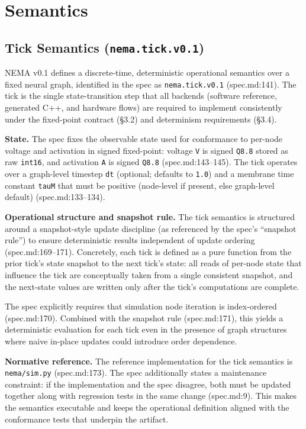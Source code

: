 \section{Semantics}

\subsection{Tick Semantics (\texttt{nema.tick.v0.1})}

NEMA v0.1 defines a discrete-time, deterministic operational semantics over a fixed neural graph, identified in the spec as \texttt{nema.tick.v0.1} (spec.md:141). The tick is the single state-transition step that all backends (software reference, generated C++, and hardware flows) are required to implement consistently under the fixed-point contract (\S3.2) and determinism requirements (\S3.4).

\textbf{State.} The spec fixes the observable state used for conformance to per-node voltage and activation in signed fixed-point: voltage \texttt{V} is signed \texttt{Q8.8} stored as raw \texttt{int16}, and activation \texttt{A} is signed \texttt{Q8.8} (spec.md:143--145). The tick operates over a graph-level timestep \texttt{dt} (optional; defaults to \texttt{1.0}) and a membrane time constant \texttt{tauM} that must be positive (node-level if present, else graph-level default) (spec.md:133--134).

\textbf{Operational structure and snapshot rule.} The tick semantics is structured around a snapshot-style update discipline (as referenced by the spec's ``snapshot rule'') to ensure deterministic results independent of update ordering (spec.md:169--171). Concretely, each tick is defined as a pure function from the prior tick's state snapshot to the next tick's state: all reads of per-node state that influence the tick are conceptually taken from a single consistent snapshot, and the next-state values are written only after the tick's computations are complete.

The spec explicitly requires that simulation node iteration is index-ordered (spec.md:170). Combined with the snapshot rule (spec.md:171), this yields a deterministic evaluation for each tick even in the presence of graph structures where naive in-place updates could introduce order dependence.

\textbf{Normative reference.} The reference implementation for the tick semantics is \texttt{nema/sim.py} (spec.md:173). The spec additionally states a maintenance constraint: if the implementation and the spec disagree, both must be updated together along with regression tests in the same change (spec.md:9). This makes the semantics executable and keeps the operational definition aligned with the conformance tests that underpin the artifact.

